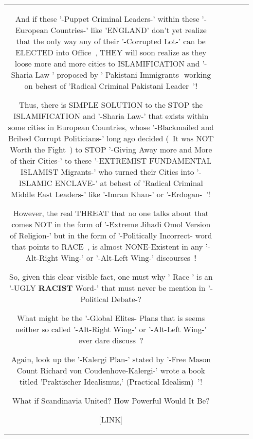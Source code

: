 \documentclass[11pt]{article}
\newlength\mylength
\begin{document}
\begin{center}
\begin{longtable}{|C{.65\mylength}|C{.30\mylength}|C{.12\mylength}|C{.12\mylength}|C{.12\mylength}|}
And if these '-Puppet Criminal Leaders-' within these '-European Countries-' like 'ENGLAND' don't yet realize that the only way any of their '-Corrupted Lot-' can be ELECTED into Office~, THEY will soon realize as they loose more and more cities to ISLAMIFICATION and '-Sharia Law-' proposed by   '-Pakistani Immigrants- working on behest of 'Radical Criminal Pakistani Leader~'!

Thus, there is SIMPLE SOLUTION to the STOP the ISLAMIFICATION and '-Sharia Law-' that exists within some cities in European Countries, whose '-Blackmailed and Bribed Corrupt Politicians-' long ago decided (~It was NOT Worth the Fight~) to STOP  '-Giving Away more and More of their Cities-' to these '-EXTREMIST FUNDAMENTAL ISLAMIST Migrants-' who turned their Cities into '-ISLAMIC ENCLAVE-' at behest of   'Radical Criminal Middle East Leaders-' like '-Imran Khan-' or '-Erdogan-~'!

However, the real THREAT that no one talks about that comes NOT in the form of '-Extreme Jihadi Omol Version of Religion-' but in the form of '-Politically Incorrect- word that points to RACE~, is almost NONE-Existent in any '-Alt-Right Wing-' or '-Alt-Left Wing-' discourses~!

So, given this clear visible fact, one must why '-Race-' is an '-UGLY \textbf{RACIST} Word-' that must never be mention in '-Political Debate-?

What might be the '-Global Elites- Plans that is seems neither so called  '-Alt-Right Wing-' or '-Alt-Left Wing-' ever dare discuss~?

Again, look up the '-Kalergi Plan-' stated by '-Free Mason Count Richard von Coudenhove-Kalergi-' wrote a book titled 'Praktischer Idealismus,' (Practical Idealism)~'!

 
What if Scandinavia United? How Powerful Would It Be?

 [LINK] 


\end{longtable}
\end{center}
\end{document}
